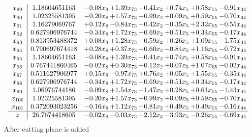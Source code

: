 \documentclass[8pt]{article}
\begin{document}
\[\begin{array}{c| c c@{\hskip 2pt} c@{\hskip 2pt} c@{\hskip 2pt} c@{\hskip 2pt} c@{\hskip 2pt} c@{\hskip 2pt} }
 x_{89}   &  1.18604651163 & -0.08 x_{8} & +  1.39 x_{73} & -0.41 x_{2} & +  0.74 x_{5} & +  0.58 x_{55} & -0.91 x_{44}\\
 x_{90}   &  1.02325581395 & -0.20 x_{8} & +  1.57 x_{73} & -0.99 x_{2} & +  0.09 x_{5} & +  0.59 x_{55} & -0.70 x_{44}\\
 x_{91}   &  1.16279069767 & +  0.12 x_{8} & -0.84 x_{73} & -0.42 x_{2} & -0.35 x_{5} & +  2.32 x_{55} & -0.55 x_{44}\\
 x_{92}   &  0.627906976744 & -0.34 x_{8} & +  1.72 x_{73} & -0.69 x_{2} & +  0.51 x_{5} & +  0.34 x_{55} & -0.17 x_{44}\\
 x_{93}   &  0.813953488372 & +  0.08 x_{8} & +  1.28 x_{73} & -0.59 x_{2} & +  0.26 x_{5} & +  1.09 x_{55} & -1.75 x_{44}\\
 x_{94}   &  0.790697674418 & +  0.28 x_{8} & +  0.37 x_{73} & -0.60 x_{2} & -0.84 x_{5} & +  1.16 x_{55} & -0.72 x_{44}\\
 x_{95}   &  1.18604651163 & -0.08 x_{8} & +  1.39 x_{73} & -0.41 x_{2} & +  0.74 x_{5} & +  0.58 x_{55} & -0.91 x_{44}\\
 x_{96}   &  0.767441860465 & -0.02 x_{8} & +  0.30 x_{73} & -0.12 x_{2} & +  0.07 x_{5} & +  1.07 x_{55} & -0.02 x_{44}\\
 x_{97}   &  0.511627906977 & +  0.15 x_{8} & -0.97 x_{73} & +  0.76 x_{2} & +  0.05 x_{5} & +  1.55 x_{55} & -0.35 x_{44}\\
 x_{98}   &  0.627906976744 & -0.34 x_{8} & +  1.72 x_{73} & -0.69 x_{2} & +  0.51 x_{5} & +  0.34 x_{55} & -0.17 x_{44}\\
 x_{99}   &  1.06976744186 & -0.09 x_{8} & +  1.54 x_{73} & -1.47 x_{2} & +  0.28 x_{5} & +  0.61 x_{55} & -1.43 x_{44}\\
 x_{100}   &  1.02325581395 & -0.20 x_{8} & +  1.57 x_{73} & -0.99 x_{2} & +  0.09 x_{5} & +  0.59 x_{55} & -0.70 x_{44}\\
 x_{101}   &  0.372093023256 & -0.16 x_{8} & +  1.12 x_{73} & -0.81 x_{2} & +  0.49 x_{5} & +  0.49 x_{55} & -0.16 x_{44}\\
\hline
z    &  26.7674418605 & -0.02 x_{8} & -0.03 x_{73} & -2.12 x_{2} & -3.93 x_{5} & -0.26 x_{55} & -0.69 x_{44}\\
\end{array}\]
 After cutting plane is added 
\end{document}
